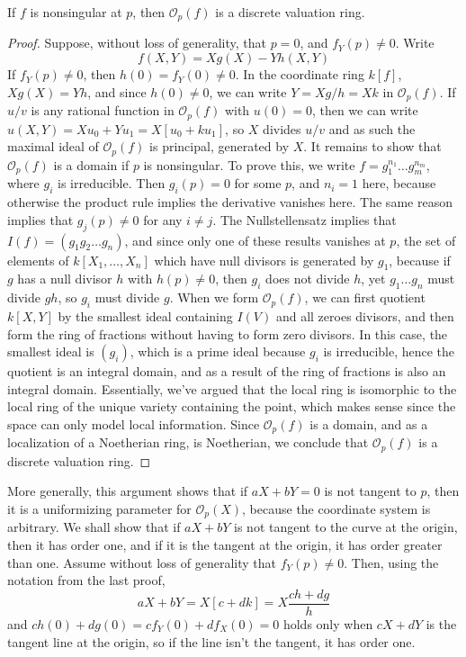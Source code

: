\begin{theorem}
    If $f$ is nonsingular at $p$, then $\mathcal{O}_p(f)$ is a discrete valuation ring.
\end{theorem}
\begin{proof}
    Suppose, without loss of generality, that $p = 0$, and $f_Y(p) \neq 0$. Write
    \[ f(X,Y) = Xg(X) - Yh(X,Y) \]
    If $f_Y(p) \neq 0$, then $h(0) = f_Y(0) \neq 0$. In the coordinate ring $k[f]$, $Xg(X) = Yh$, and since $h(0) \neq 0$, we can write $Y = Xg/h = Xk$ in $\mathcal{O}_p(f)$. If $u/v$ is any rational function in $\mathcal{O}_p(f)$ with $u(0) = 0$, then we can write $u(X,Y) = Xu_0 + Yu_1 = X[u_0 + ku_1]$, so $X$ divides $u/v$ and as such the maximal ideal of $\mathcal{O}_p(f)$ is principal, generated by $X$. It remains to show that $\mathcal{O}_p(f)$ is a domain if $p$ is nonsingular. To prove this, we write $f = g_1^{n_1} \dots g_m^{n_m}$, where $g_i$ is irreducible. Then $g_i(p) = 0$ for some $p$, and $n_i = 1$ here, because otherwise the product rule implies the derivative vanishes here. The same reason implies that $g_j(p) \neq 0$ for any $i \neq j$. The Nullstellensatz implies that $I(f) = (g_1 g_2 \dots g_n)$, and since only one of these results vanishes at $p$, the set of elements of $k[X_1, \dots, X_n]$ which have null divisors is generated by $g_1$, because if $g$ has a null divisor $h$ with $h(p) \neq 0$, then $g_i$ does not divide $h$, yet $g_1 \dots g_n$ must divide $gh$, so $g_i$ must divide $g$. When we form $\mathcal{O}_p(f)$, we can first quotient $k[X,Y]$ by the smallest ideal containing $I(V)$ and all zeroes divisors, and then form the ring of fractions without having to form zero divisors. In this case, the smallest ideal is $(g_i)$, which is a prime ideal because $g_i$ is irreducible, hence the quotient is an integral domain, and as a result of the ring of fractions is also an integral domain. Essentially, we've argued that the local ring is isomorphic to the local ring of the unique variety containing the point, which  makes sense since the space can only model local information. Since $\mathcal{O}_p(f)$ is a domain, and as a localization of a Noetherian ring, is Noetherian, we conclude that $\mathcal{O}_p(f)$ is a discrete valuation ring.
\end{proof}

\begin{example}
    More generally, this argument shows that if $aX + bY = 0$ is not tangent to $p$, then it is a uniformizing parameter for $\mathcal{O}_p(X)$, because the coordinate system is arbitrary. We shall show that if $aX + bY$ is not tangent to the curve at the origin, then it has order one, and if it is the tangent at the origin, it has order greater than one. Assume without loss of generality that $f_Y(p) \neq 0$. Then, using the notation from the last proof,
    \[ aX + bY = X[c + dk] =  X \frac{ch + dg}{h} \]
    and $ch(0) + dg(0) = cf_Y(0) + df_X(0) = 0$ holds only when $cX + dY$ is the tangent line at the origin, so if the line isn't the tangent, it has order one.
\end{example}

